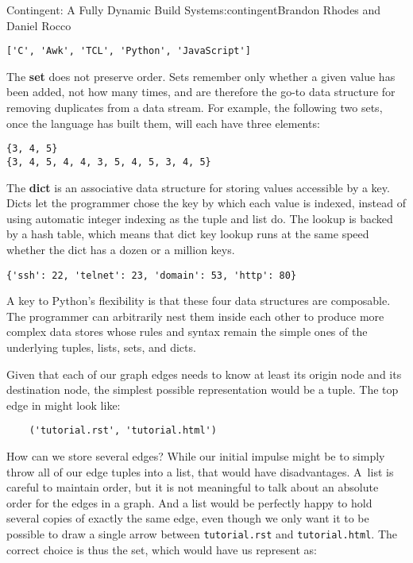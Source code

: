\begin{aosachapter}{Contingent: A Fully Dynamic Build System}{s:contingent}{Brandon Rhodes and Daniel Rocco}
\begin{verbatim}
['C', 'Awk', 'TCL', 'Python', 'JavaScript']
\end{verbatim}

The \textbf{set} does not preserve order. Sets remember only whether a
given value has been added, not how many times, and are therefore the
go-to data structure for removing duplicates from a data stream. For
example, the following two sets, once the language has built them, will
each have three elements:

\begin{verbatim}
{3, 4, 5}
{3, 4, 5, 4, 4, 3, 5, 4, 5, 3, 4, 5}
\end{verbatim}

The \textbf{dict} is an associative data structure for storing values
accessible by a key. Dicts let the programmer chose the key by which
each value is indexed, instead of using automatic integer indexing as
the tuple and list do. The lookup is backed by a hash table, which means
that dict key lookup runs at the same speed whether the dict has a dozen
or a million keys.

\begin{verbatim}
{'ssh': 22, 'telnet': 23, 'domain': 53, 'http': 80}
\end{verbatim}

A key to Python's flexibility is that these four data structures are
composable. The programmer can arbitrarily nest them inside each other
to produce more complex data stores whose rules and syntax remain the
simple ones of the underlying tuples, lists, sets, and dicts.

Given that each of our graph edges needs to know at least its origin
node and its destination node, the simplest possible representation
would be a tuple. The top edge in 
might look like:

\begin{verbatim}
    ('tutorial.rst', 'tutorial.html')
\end{verbatim}

How can we store several edges? While our initial impulse might be to
simply throw all of our edge tuples into a list, that would have
disadvantages. A~list is careful to maintain order, but it is not
meaningful to talk about an absolute order for the edges in a graph. And
a list would be perfectly happy to hold several copies of exactly the
same edge, even though we only want it to be possible to draw a single
arrow between \texttt{tutorial.rst} and \texttt{tutorial.html}. The
correct choice is thus the set, which would have us represent
 as:


\end{aosachapter}
